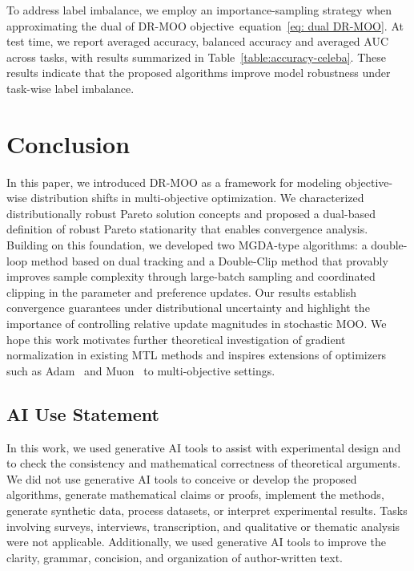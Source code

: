 \documentclass[twoside]{article} %
\def\eqref#1{equation~\ref{#1}}
\theoremstyle{plain}
\theoremstyle{definition}
\theoremstyle{remark}
\begin{document}
To address label imbalance, we employ an importance-sampling strategy when approximating the dual of DR-MOO objective~\eqref{eq: dual DR-MOO}. At test time, we report averaged accuracy, balanced accuracy and averaged AUC across tasks, with results summarized in Table~\ref{table:accuracy-celeba}. These results indicate that the proposed algorithms improve model robustness under task-wise label imbalance.


\section{Conclusion}
In this paper, we introduced DR-MOO as a framework for modeling objective-wise distribution shifts in multi-objective optimization. We characterized distributionally robust Pareto solution concepts and proposed a dual-based definition of robust Pareto stationarity that enables convergence analysis. Building on this foundation, we developed two MGDA-type algorithms: a double-loop method based on dual tracking and a Double-Clip method that provably improves sample complexity through large-batch sampling and coordinated clipping in the parameter and preference updates. Our results establish convergence guarantees under distributional uncertainty and highlight the importance of controlling relative update magnitudes in stochastic MOO. We hope this work motivates further theoretical investigation of gradient normalization in existing MTL methods and inspires extensions of optimizers such as Adam~\citep{kingma2014adam} and Muon~\citep{jordan2024muon} to multi-objective settings.






\subsection*{AI Use Statement}
In this work, we used generative AI tools to assist with experimental design and to check the consistency and mathematical correctness of theoretical arguments. We did not use generative AI tools to conceive or develop the proposed algorithms, generate mathematical claims or proofs, implement the methods, generate synthetic data, process datasets, or interpret experimental results. Tasks involving surveys, interviews, transcription, and qualitative or thematic analysis were not applicable. Additionally, we used generative AI tools to improve the clarity, grammar, concision, and organization of author-written text.
\end{document}
